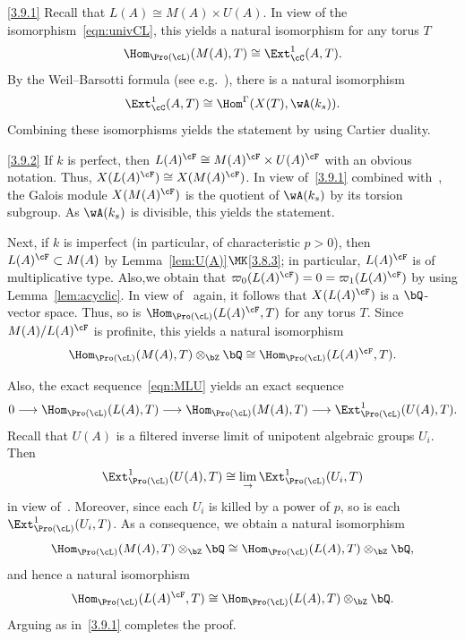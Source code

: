 \begin{proofc}
\begin{step}{\eqref{3.9.1}}%
Recall that $L(A) \cong M(A) \times U(A)$. In view of the isomorphism~\eqref{eqn:univCL}, this yields a natural isomorphism for any torus $T$
\[
\Hom_{\Pro(\cL)}(M(A),T) \cong \Ext^1_{\cC}(A,T).
\]
By the Weil--Barsotti formula (see e.g.~\cite[III.17,III.18]{Oort}), there is a natural isomorphism
\[
\Ext^1_{\cC}(A,T) \cong
\Hom^{\Gamma}(X(T), \wA(k_s)).
\]
Combining these isomorphisms yields the statement by using Cartier duality.
\end{step}

\begin{laststep}{\eqref{3.9.2}}%
If $k$ is perfect, then $L(A)^{\cF} \cong M(A)^{\cF} \times U(A)^{\cF}$ with an obvious notation. Thus, $X(L(A)^{\cF}) \cong X(M(A)^{\cF})$. In view of~\eqref{3.9.1} combined with~\cite[V.3.5.2]{DG}, the Galois module $X(M(A)^{\cF})$ is the quotient of $\wA(k_s)$ by its torsion subgroup. As $\wA(k_s)$ is divisible, this yields the statement.

Next, if $k$ is imperfect (in particular, of characteristic $p > 0$), then $L(A)^{\cF} \subset M(A)$ by Lemma~\ref{lem:U(A)}$\MK$\eqref{3.8.3}; in particular, $L(A)^{\cF}$ is of multiplicative type. Also,we obtain that $\varpi_0(L(A)^{\cF}) = 0 = \varpi_1(L(A)^{\cF})$ by using Lemma~\ref{lem:acyclic}. In view of~\cite[V.3.5.2]{DG} again, it follows that $X(L(A)^{\cF})$ is a $\bQ$-vector space. Thus, so is $\Hom_{\Pro(\cL)}(L(A)^{\cF},T)$ for any torus $T$. Since $M(A)/L(A)^{\cF}$ is profinite, this yields a natural isomorphism
\[
\Hom_{\Pro(\cL)}(M(A),T) \otimes_{\bZ} \bQ
\cong \Hom_{\Pro(\cL)}(L(A)^{\cF},T).
\]

Also, the exact sequence~\eqref{eqn:MLU} yields an exact sequence
\[
0 \longrightarrow \Hom_{\Pro(\cL)}(L(A),T)
\longrightarrow \Hom_{\Pro(\cL)}(M(A),T)
\longrightarrow \Ext^1_{\Pro(\cL)}(U(A),T).
\]
Recall that $U(A)$ is a filtered inverse limit of unipotent algebraic groups $U_i$. Then
\[
\Ext^1_{\Pro(\cL)}(U(A),T) \cong
\lim_{\to} \Ext^1_{\Pro(\cL)}(U_i,T)
\]
in view of~\cite[V.2.3.9]{DG}. Moreover, since each $U_i$ is killed by a power of $p$, so is each $\Ext^1_{\Pro(\cL)}(U_i,T)$. As a consequence, we obtain a natural isomorphism
\[
\Hom_{\Pro(\cL)}(M(A),T) \otimes_{\bZ} \bQ
\cong
\Hom_{\Pro(\cL)}(L(A),T) \otimes_{\bZ} \bQ,
\]
and hence a natural isomorphism
\[
\Hom_{\Pro(\cL)}(L(A)^{\cF},T) \cong
\Hom_{\Pro(\cL)}(L(A),T) \otimes_{\bZ} \bQ.
\]
Arguing as in~\eqref{3.9.1} completes the proof.
\end{laststep}
\let\qed\relax
\end{proofc}

